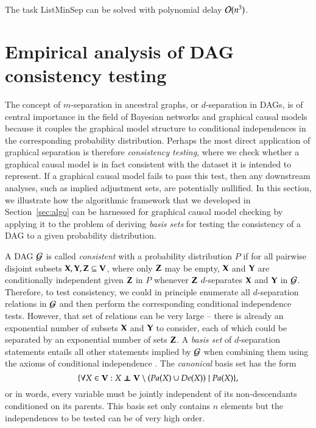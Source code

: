 \begin{proposition}\label{prop:ListMinSep}
The task {\sc ListMinSep} can be solved with polynomial delay ${\cal O}(n^3)$.
\end{proposition}

\section{Empirical analysis of DAG consistency testing}

\label{sec:basissets}

The concept of $m$-separation in ancestral graphs, or $d$-separation in DAGs, is of central importance in the field of Bayesian networks and graphical causal models because it couples the graphical model structure to conditional independences in the corresponding probability distribution. Perhaps the most direct application of graphical separation is therefore \emph{consistency testing}, where we check whether a graphical causal model is in fact consistent with the dataset it is intended to represent. If a graphical causal model fails to pass this test, then any downstream analyses, such as implied adjustment sets, are potentially nullified. 
In this section, we illustrate how the algorithmic framework that we developed in Section~\ref{sec:algo} can be harnessed for graphical causal model checking by applying it to the problem of deriving \emph{basis sets} for testing the consistency of a DAG to a given probability distribution. 

A DAG ${\cal G}$ is called \emph{consistent} with a probability distribution $P$ if for all pairwise disjoint subsets ${\bf X},{\bf Y},{\bf Z} \subseteq {\bf V}$, where only ${\bf Z}$ may be empty, ${\bf X}$ and ${\bf Y}$ are conditionally independent given ${\bf Z}$ in $P$ whenever ${\bf Z}$ $d$-separates ${\bf X}$ and ${\bf Y}$ in ${\cal G}$. Therefore, to test consistency, we could in principle enumerate all $d$-separation relations in ${\cal G}$ and then perform the corresponding conditional independence tests. However, that set of relations can be very large -- there is already an exponential number of subsets ${\bf X}$ and ${\bf Y}$ to consider, each of which could be separated by an exponential number of sets ${\bf Z}$. A \emph{basis set} of $d$-separation statements entails all other statements implied by ${\cal G}$ when combining them using the axioms of conditional independence \cite{Dawid1979}. The \emph{canonical} basis set has the form
$$
\{ \forall X \in \bV: X \independent \bV \setminus (\textit{Pa}(X) \cup \textit{De}(X)) \mid \textit{Pa}(X) \},
$$
or in words, every variable must be jointly independent of its non-descendants conditioned on its parents. This basis set only contains $n$ elements but the independences to be tested can be of very high order. 

